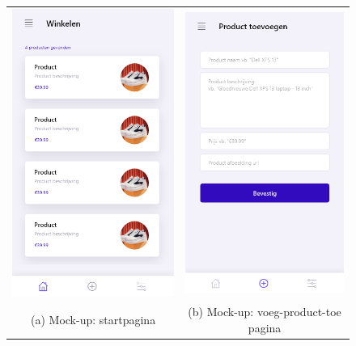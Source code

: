 \begin{figure}
    \begin{tabular}{cc}
        \includegraphics[width=65mm]{img/methodologie/mock-home_screen.png} &   \includegraphics[width=65mm]{img/methodologie/mock-add_product_screen.png} \\
        (a) Mock-up: startpagina & (b) Mock-up: voeg-product-toe pagina\\[6pt]

\end{tabular}
\end{figure}
